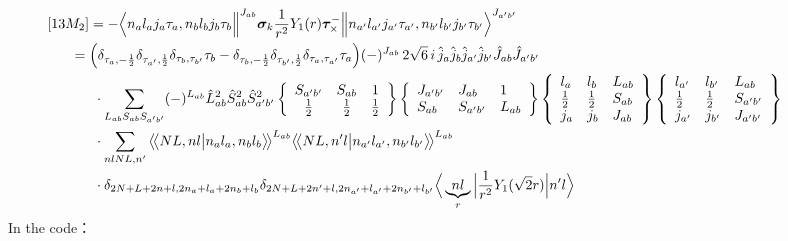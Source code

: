 \documentclass[master]{shnuthesis}
\newcommand{\llangle}{\big\langle\!\big\langle}
\newcommand{\rrangle}{\big\rangle\!\big\rangle}
\newcommand{\ap}{a^\prime}
\newcommand{\bp}{b^\prime}
\newcommand{\il}{\!\!\!\!\!\!\!\!\!\!}
\newcommand{\ii}{\!\!\!\!\!\!\!\!\!\!\!\!\!\!\!\!\!\!\!\!}
\begin{document}
\begin{align}
    &\ii [13M_2] = -\Big\langle n_a l_a j_a \tau_a, n_b l_b j_b \tau_b \Big\|^{J_{ab}} \bm{\sigma}_k\frac{1}{r^2}Y_1(r)\bm{\tau}_\times^- \Big\| n_{\ap} l_{\ap} j_{\ap} \tau_{\ap}, n_{\bp} l_{\bp} j_{\bp} \tau_{\bp} \Big\rangle^{J_{\ap \bp}} \notag\\
    &\il = \Big( \delta_{\tau_a,-\frac{1}{2}}\delta_{\tau_{\ap},\frac{1}{2}}\delta_{\tau_b,\tau_{\bp}}\tau_b - \delta_{\tau_b,-\frac{1}{2}}\delta_{\tau_{\bp},\frac{1}{2}}\delta_{\tau_a,\tau_{\ap}}\tau_a \Big) (-)^{J_{ab}}\,2\sqrt{6}\,i\,\hat{j}_a\hat{j}_b\hat{j}_{\ap}\hat{j}_{\bp}\hat{J}_{ab}\hat{J}_{\ap\bp}  \notag\\
    & \cdot \sum_{L_{ab}S_{ab}S_{\ap\bp}} (-)^{L_{ab}} \hat{L}_{ab}^2\hat{S}_{ab}^2\hat{S}_{\ap\bp}^2  \left\{\begin{array}{ccc} S_{\ap\bp} & S_{ab} & 1 \\ \frac{1}{2} & \frac{1}{2} & \frac{1}{2} \end{array}\right\}  \left\{\begin{array}{lll} J_{\ap\bp} & J_{ab} & 1 \\ S_{ab} & S_{\ap\bp} & L_{ab} \end{array}\right\}  \left\{\begin{array}{lll}l_{a} & l_{b} & L_{ab} \\ \frac{1}{2} & \frac{1}{2} & S_{ab} \\j_{a} & j_{b} & J_{ab} \end{array}\right\} \left\{\begin{array}{lll} l_{\ap} & l_{\bp} & L_{ab} \\ \frac{1}{2} & \frac{1}{2} & S_{\ap\bp} \\j_{\ap} & j_{\bp} & J_{\ap\bp} \end{array}\right\}  \notag \\
    & \cdot \sum_{nlNL,n^\prime} \llangle N L, n l \big| n_{a} l_{a}, n_{b} l_{b} \rrangle^{L_{ab}} \llangle N L, n^\prime l \big| n_{a^\prime} l_{a^\prime}, n_{b^\prime} l_{b^\prime} \rrangle^{L_{ab}} \notag\\
    & \cdot \delta_{2N+L+2n+l,2n_a+l_a+2n_b+l_b}\delta_{2N+L+2n^\prime+l,2n_{a^\prime}+l_{a^\prime}+2n_{b^\prime}+l_{b^\prime}} \Big\langle \underbrace{n l}_{r} \Big| \frac{1}{r^2}Y_1(\sqrt{2}r) \Big| n^\prime l \Big\rangle
\end{align}
In the code：
\end{document}
